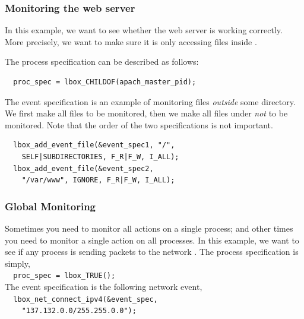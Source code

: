 

\subsubsection{Monitoring the web server}

In this example, we want to see whether the web server is working correctly.
More precisely, we want to make sure it is only accessing files inside
.

The process specification can be described as follows:
{
\small
\begin{verbatim}
  proc_spec = lbox_CHILDOF(apach_master_pid);
\end{verbatim}
}
\noindent
The event specification is an example of
monitoring files {\em outside} some directory.
We first make all files to be monitored, then we make
all files under  {\em not} to be monitored.
Note that the order of the two specifications is not important.
{
\small
\begin{verbatim}
  lbox_add_event_file(&event_spec1, "/",
    SELF|SUBDIRECTORIES, F_R|F_W, I_ALL);
  lbox_add_event_file(&event_spec2,
    "/var/www", IGNORE, F_R|F_W, I_ALL);
\end{verbatim}
}

\subsubsection{Global Monitoring}

Sometimes you need to monitor all actions on a single process;
and other times you need to monitor a single action on all processes.
In this example, we want to see if any process is sending packets
to the network .
The process specification is simply, \\
{\small\verb|  proc_spec = lbox_TRUE();|} \\
The event specification is the following network event, \\
{\small\verb|  lbox_net_connect_ipv4(&event_spec,|} \\
{\small\verb|    "137.132.0.0/255.255.0.0");|}

